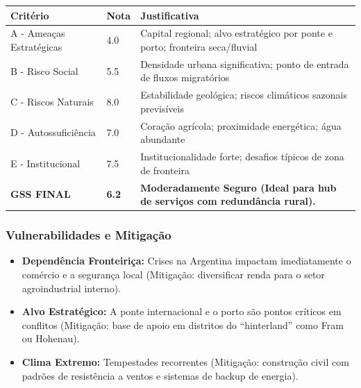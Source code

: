 \begin{table}[ht!]
\small \begin{tabular}{p{3.0cm}p{0.8cm}p{6.0cm}} \toprule
\textbf{Critério} & \textbf{Nota} & \textbf{Justificativa} \\ \midrule
A - Ameaças Estratégicas & 4.0 & Capital regional; alvo estratégico por ponte e porto; fronteira seca/\allowbreak fluvial \\
B - Risco Social & 5.5 & Densidade urbana significativa; ponto de entrada de fluxos migratórios \\
C - Riscos Naturais & 8.0 & Estabilidade geológica; riscos climáticos sazonais previsíveis \\
D - Autossuficiência & 7.0 & Coração agrícola; proximidade energética; água abundante \\
E - Institucional & 7.5 & Institucionalidade forte; desafios típicos de zona de fronteira \\
\midrule \textbf{GSS FINAL} & \textbf{6.2} & \textbf{Moderadamente Seguro (Ideal para hub de serviços com redundância rural).} \\ \bottomrule \end{tabular}
\end{table}
\subsubsection{Vulnerabilidades e
Mitigação}

\begin{itemize}
\tightlist
\item
  \textbf{Dependência Fronteiriça:} Crises na Argentina impactam
  imediatamente o comércio e a segurança local (Mitigação: diversificar
  renda para o setor agroindustrial interno).
\item
  \textbf{Alvo Estratégico:} A ponte internacional e o porto são pontos
  críticos em conflitos (Mitigação: base de apoio em distritos do
  ``hinterland'' como Fram ou Hohenau).
\item
  \textbf{Clima Extremo:} Tempestades recorrentes (Mitigação: construção
  civil com padrões de resistência a ventos e sistemas de backup de
  energia).
\end{itemize}

